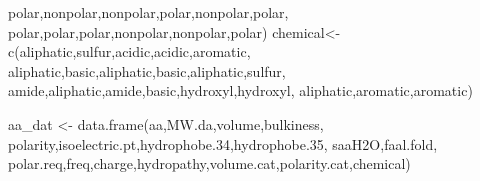 \documentclass[
]{book}
\newenvironment{Shaded}{\begin{snugshade}}{\end{snugshade}}
\newcommand{\FloatTok}[1]{\textcolor[rgb]{0.00,0.00,0.81}{#1}}
\newcommand{\FunctionTok}[1]{\textcolor[rgb]{0.00,0.00,0.00}{#1}}
\newcommand{\NormalTok}[1]{#1}
\newcommand{\OtherTok}[1]{\textcolor[rgb]{0.56,0.35,0.01}{#1}}
\newcommand{\StringTok}[1]{\textcolor[rgb]{0.31,0.60,0.02}{#1}}
\begin{document}
\begin{Shaded}
\begin{Highlighting}[]
                \StringTok{\textquotesingle{}polar\textquotesingle{}}\NormalTok{,}\StringTok{\textquotesingle{}nonpolar\textquotesingle{}}\NormalTok{,}\StringTok{\textquotesingle{}nonpolar\textquotesingle{}}\NormalTok{,}\StringTok{\textquotesingle{}polar\textquotesingle{}}\NormalTok{,}\StringTok{\textquotesingle{}nonpolar\textquotesingle{}}\NormalTok{,}\StringTok{\textquotesingle{}polar\textquotesingle{}}\NormalTok{,}
                \StringTok{\textquotesingle{}polar\textquotesingle{}}\NormalTok{,}\StringTok{\textquotesingle{}polar\textquotesingle{}}\NormalTok{,}\StringTok{\textquotesingle{}polar\textquotesingle{}}\NormalTok{,}\StringTok{\textquotesingle{}nonpolar\textquotesingle{}}\NormalTok{,}\StringTok{\textquotesingle{}nonpolar\textquotesingle{}}\NormalTok{,}\StringTok{\textquotesingle{}polar\textquotesingle{}}\NormalTok{)}
\NormalTok{chemical}\OtherTok{\textless{}{-}}\FunctionTok{c}\NormalTok{(}\StringTok{\textquotesingle{}aliphatic\textquotesingle{}}\NormalTok{,}\StringTok{\textquotesingle{}sulfur\textquotesingle{}}\NormalTok{,}\StringTok{\textquotesingle{}acidic\textquotesingle{}}\NormalTok{,}\StringTok{\textquotesingle{}acidic\textquotesingle{}}\NormalTok{,}\StringTok{\textquotesingle{}aromatic\textquotesingle{}}\NormalTok{,}
            \StringTok{\textquotesingle{}aliphatic\textquotesingle{}}\NormalTok{,}\StringTok{\textquotesingle{}basic\textquotesingle{}}\NormalTok{,}\StringTok{\textquotesingle{}aliphatic\textquotesingle{}}\NormalTok{,}\StringTok{\textquotesingle{}basic\textquotesingle{}}\NormalTok{,}\StringTok{\textquotesingle{}aliphatic\textquotesingle{}}\NormalTok{,}\StringTok{\textquotesingle{}sulfur\textquotesingle{}}\NormalTok{,}
            \StringTok{\textquotesingle{}amide\textquotesingle{}}\NormalTok{,}\StringTok{\textquotesingle{}aliphatic\textquotesingle{}}\NormalTok{,}\StringTok{\textquotesingle{}amide\textquotesingle{}}\NormalTok{,}\StringTok{\textquotesingle{}basic\textquotesingle{}}\NormalTok{,}\StringTok{\textquotesingle{}hydroxyl\textquotesingle{}}\NormalTok{,}\StringTok{\textquotesingle{}hydroxyl\textquotesingle{}}\NormalTok{,}
            \StringTok{\textquotesingle{}aliphatic\textquotesingle{}}\NormalTok{,}\StringTok{\textquotesingle{}aromatic\textquotesingle{}}\NormalTok{,}\StringTok{\textquotesingle{}aromatic\textquotesingle{}}\NormalTok{)}

\NormalTok{aa\_dat }\OtherTok{\textless{}{-}} \FunctionTok{data.frame}\NormalTok{(aa,MW.da,volume,bulkiness,}
\NormalTok{polarity,isoelectric.pt,hydrophobe}\FloatTok{.34}\NormalTok{,hydrophobe}\FloatTok{.35}\NormalTok{,}
\NormalTok{saaH2O,faal.fold, polar.req,freq,charge,hydropathy,volume.cat,polarity.cat,chemical)}
\end{Highlighting}
\end{Shaded}
\end{document}
